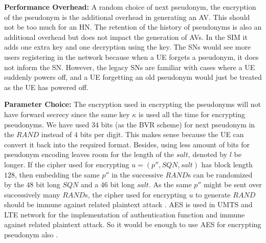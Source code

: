 \documentclass{llncs} %
\begin{document}

\textbf{Performance Overhead:} A random choice of next pseudonym, the encryption of the pseudonym is the additional overhead in generating an AV. This should not be too much for an HN. The retention of the history of pseudonyms is also an additional overhead but does not impact the generation of AVs. In the SIM it adds one extra key and one decryption using the key. The SNs would see more users registering in the network because when a UE forgets a pseudonym, it does not inform the SN. However, the legacy SNs are familiar with cases where a UE suddenly powers off, and a UE forgetting an old pseudonym would just be treated as the UE has powered off.

\textbf{Parameter Choice:} The encryption used in encrypting the pseudonyms will not have forward secrecy since the same key $\kappa$ is used all the time for encrypting pseudonyms. We have used $34$ bits (as the BVR scheme) for next pseudonym in the $RAND$ instead of $4$ bits per digit. This makes sense because the UE can convert it back into the required format. Besides, using less amount of bits for pseudonym encoding leaves room for the length of the $salt$, denoted by $l$ be longer. If the cipher used for encrypting $u=\left(p'',SQN,salt\right)$ has block length $128$, then embedding the same $p''$ in the successive $RAND$s can be randomized by the $48$ bit long $SQN$ and a $46$ bit long $salt$. As the same $p''$ might be sent over successively many $RAND$s, the cipher used for encrypting $u$ to generate $RAND$ should be immune against related plaintext attack \cite{CCS15}. AES is used in UMTS and LTE network for the implementation of authentication function and immune against related plaintext attack. So it would be enough to use AES for encrypting pseudonym also \cite{CCS15}. 
\end{document}
